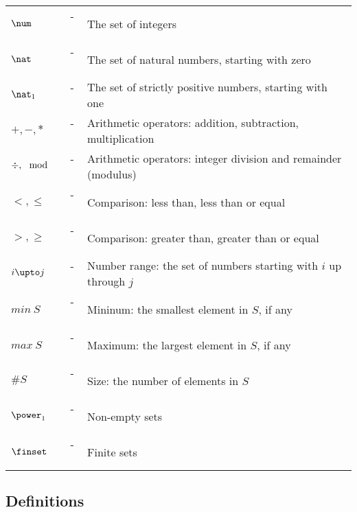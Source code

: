 \documentclass{article}
\begin{document}
\begin{tabular}{l c l}
$\num$ & ~-~ & The set of integers \\
$\nat$ & ~-~ & The set of natural numbers, starting with zero \\
$\nat_1$ & ~-~ & The set of strictly positive numbers, starting with one \\
$+,-,*$ & ~-~ & Arithmetic operators: addition, subtraction, multiplication \\
$\div,\mod$ & ~-~ & Arithmetic operators: integer division and remainder (modulus) \\
$<,\leq$ & ~-~ &  Comparison: less than, less than or equal \\
$>, \geq$ & ~-~ & Comparison: greater than, greater than or equal \\
$i \upto j$ & ~-~ & Number range: the set of numbers starting with $i$ up through $j$ \\
$min~S$ & ~-~ & Mininum: the smallest element in $S$, if any \\
$max~S$ & ~-~ & Maximum: the largest element in $S$, if any \\
$\# S$	& ~-~ & Size: the number of elements in $S$ \\
$\power_1$ & ~-~ & Non-empty sets \\
$\finset$ & ~-~ & Finite sets \\
\end{tabular}

\subsection*{Definitions}


\end{document}
